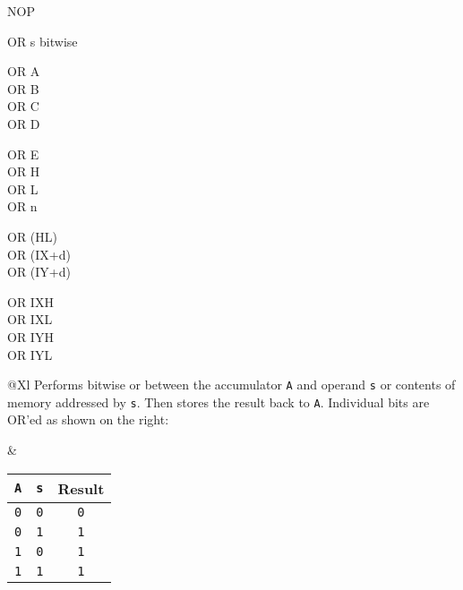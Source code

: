 \begin{basedescript}{
	\desclabelstyle{\multilinelabel}
	\desclabelwidth{3cm}}
\begin{DetailItem}{NOP}
		\begin{DetailTiming}
		\end{DetailTiming}

	\end{DetailItem}

	\begin{DetailItem}{OR s}
		{bitwise }
		{}

		\begin{DetailVariants}[4]
			OR A\\
			OR B\\
			OR C\\
			OR D

			\columnbreak
			OR E\\
			OR H\\
			OR L\\
			OR n

			\columnbreak
			OR (HL)\\
			OR (IX+d)\\
			OR (IY+d)

			\columnbreak
			OR IXH\UNDOC\\
			OR IXL\UNDOC\\
			OR IYH\UNDOC\\
			OR IYL\UNDOC
		\end{DetailVariants}

		\begin{tabularx}{\linewidth}{@{}Xl}
			Performs bitwise or between the accumulator {\tt A} and operand {\tt s} or contents of memory addressed by {\tt s}. Then stores the result back to {\tt A}. Individual bits are OR'ed as shown on the right:
	
			&

			\begin{tabular}[t]{cc|c}
				{\tt A} & {\tt s} & Result \\
				\hline
				{\tt 0} & {\tt 0} & {\tt 0} \\
				{\tt 0} & {\tt 1} & {\tt 1} \\
				{\tt 1} & {\tt 0} & {\tt 1} \\
				{\tt 1} & {\tt 1} & {\tt 1} \\
			\end{tabular}

			\\
		\end{tabularx}

		\begin{DetailEffects}[p]
			\FlagsORr
		\end{DetailEffects}
				

\end{DetailItem}
\end{basedescript}
